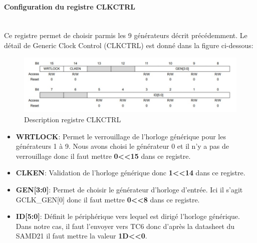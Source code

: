 \documentclass[a4paper]{article}
\begin{document}
	\newpage
	
	\paragraph{Configuration du registre CLKCTRL} 
	~~\\
	Ce registre permet de choisir parmis les 9 générateurs décrit précédemment. Le détail de Generic Clock Control (CLKCTRL) est donné dans la figure ci-dessous:\\
	\begin{figure}[H]
		\centering
		\includegraphics[width=12cm]{CLKCTRL.jpg}
		\caption{Description registre CLKCTRL}
	\end{figure}
	
	\begin{itemize}
		\item {\bf WRTLOCK}: Permet le verrouillage de l’horloge générique pour les générateurs 1 à 9. Nous avons choisi le générateur 0 et il n’y a pas de verrouillage donc il faut mettre {\bf 0\textless\textless15} dans ce registre.~~\\
		\item {\bf CLKEN}: Validation de l’horloge générique donc {\bf 1\textless\textless14} dans ce registre.~~\\
		\item {\bf GEN[3:0]}: Permet de choisir le générateur d’horloge d’entrée. Ici il s’agit GCLK\_GEN[0] donc il faut mettre {\bf 0\textless\textless8} dans ce registre.~~\\
		\item {\bf ID[5:0]}: Définit le périphérique vers lequel est dirigé l’horloge générique. Dans notre cas, il faut l’envoyer vers TC6 donc d’après la datasheet du SAMD21 il faut mettre la valeur {\bf 1D\textless\textless0}.~~\\
	\end{itemize}
	
\end{document}
